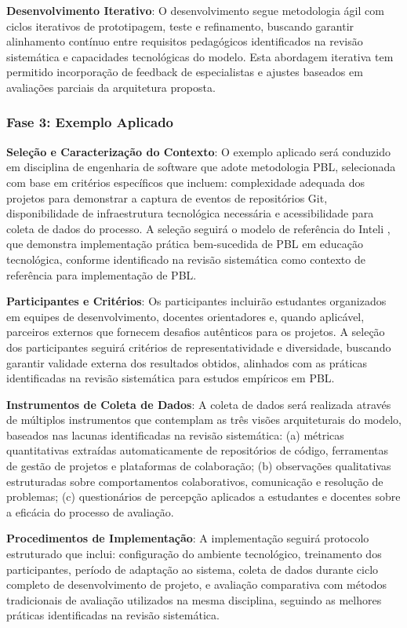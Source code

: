 \documentclass[12pt,a4paper]{article}
\begin{document}
\textbf{Desenvolvimento Iterativo}: O desenvolvimento segue metodologia ágil com ciclos iterativos de prototipagem, teste e refinamento, buscando garantir alinhamento contínuo entre requisitos pedagógicos identificados na revisão sistemática e capacidades tecnológicas do modelo. Esta abordagem iterativa tem permitido incorporação de feedback de especialistas e ajustes baseados em avaliações parciais da arquitetura proposta.

\subsubsection{Fase 3: Exemplo Aplicado}

\textbf{Seleção e Caracterização do Contexto}: O exemplo aplicado será conduzido em disciplina de engenharia de software que adote metodologia PBL, selecionada com base em critérios específicos que incluem: complexidade adequada dos projetos para demonstrar a captura de eventos de repositórios Git, disponibilidade de infraestrutura tecnológica necessária e acessibilidade para coleta de dados do processo. A seleção seguirá o modelo de referência do Inteli \cite{inteli_ppc_2024}, que demonstra implementação prática bem-sucedida de PBL em educação tecnológica, conforme identificado na revisão sistemática como contexto de referência para implementação de PBL.

\textbf{Participantes e Critérios}: Os participantes incluirão estudantes organizados em equipes de desenvolvimento, docentes orientadores e, quando aplicável, parceiros externos que fornecem desafios autênticos para os projetos. A seleção dos participantes seguirá critérios de representatividade e diversidade, buscando garantir validade externa dos resultados obtidos, alinhados com as práticas identificadas na revisão sistemática para estudos empíricos em PBL.

\textbf{Instrumentos de Coleta de Dados}: A coleta de dados será realizada através de múltiplos instrumentos que contemplam as três visões arquiteturais do modelo, baseados nas lacunas identificadas na revisão sistemática: (a) métricas quantitativas extraídas automaticamente de repositórios de código, ferramentas de gestão de projetos e plataformas de colaboração; (b) observações qualitativas estruturadas sobre comportamentos colaborativos, comunicação e resolução de problemas; (c) questionários de percepção aplicados a estudantes e docentes sobre a eficácia do processo de avaliação.

\textbf{Procedimentos de Implementação}: A implementação seguirá protocolo estruturado que inclui: configuração do ambiente tecnológico, treinamento dos participantes, período de adaptação ao sistema, coleta de dados durante ciclo completo de desenvolvimento de projeto, e avaliação comparativa com métodos tradicionais de avaliação utilizados na mesma disciplina, seguindo as melhores práticas identificadas na revisão sistemática.
\end{document}
